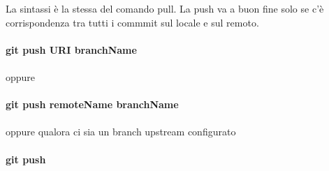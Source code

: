 \documentclass[a4paper,12pt]{report}
\begin{document}
\begin{itemize}
La sintassi è la stessa del comando pull. La push va a buon fine solo se c'è corrispondenza tra tutti i commmit sul locale e sul remoto. 
\\\\
\textbf{git push URI branchName}
\\\\
oppure
\\\\
\textbf{git push remoteName branchName}
\\\\
oppure qualora ci sia un branch upstream configurato
\\\\
\textbf{git push}
\\\\
\end{itemize}
\end{document}
